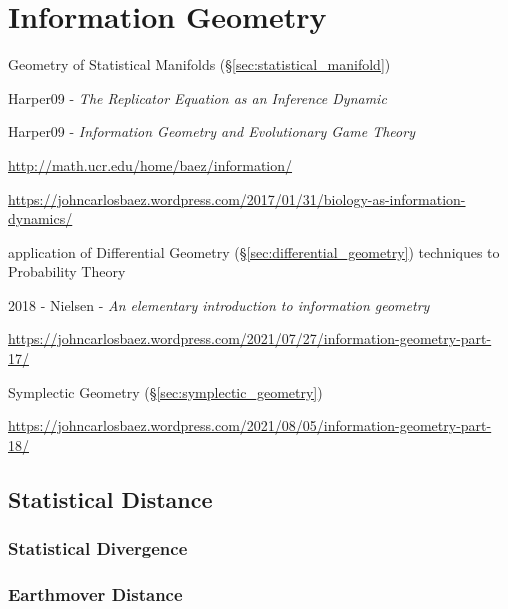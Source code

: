 \section{Information Geometry}\label{sec:information_geometry}

Geometry of Statistical Manifolds (\S\ref{sec:statistical_manifold})

Harper09 - \emph{The Replicator Equation as an Inference Dynamic}

Harper09 - \emph{Information Geometry and Evolutionary Game Theory}

\url{http://math.ucr.edu/home/baez/information/}

\url{https://johncarlosbaez.wordpress.com/2017/01/31/biology-as-information-dynamics/}

application of Differential Geometry
(\S\ref{sec:differential_geometry}) techniques to Probability Theory

2018 - Nielsen - \emph{An elementary introduction to information geometry}

\url{https://johncarlosbaez.wordpress.com/2021/07/27/information-geometry-part-17/}

Symplectic Geometry (\S\ref{sec:symplectic_geometry})

\url{https://johncarlosbaez.wordpress.com/2021/08/05/information-geometry-part-18/}



\subsection{Statistical Distance}\label{sec:statistical_distance}


\subsubsection{Statistical Divergence}\label{sec:statistical_divergence}

\subsubsection{Earthmover Distance}\label{sec:earthmover_distance}

